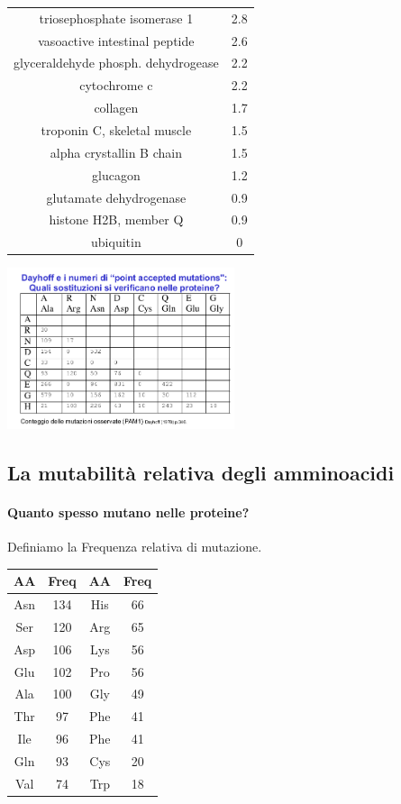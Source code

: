 \documentclass{article}
\begin{document}
\begin{center}
\begin{tabular}{c|c}
        triosephosphate isomerase 1 & 2.8 \\
        vasoactive intestinal peptide & 2.6 \\
        glyceraldehyde phosph. dehydrogease & 2.2 \\
        cytochrome c & 2.2 \\
        collagen & 1.7 \\
        troponin C, skeletal muscle & 1.5 \\
        alpha crystallin B chain & 1.5 \\
        glucagon & 1.2 \\
        glutamate dehydrogenase & 0.9 \\
        histone H2B, member Q & 0.9 \\
        ubiquitin & 0
    \end{tabular}
\end{center}
\begin{center}
    \includegraphics[width=0.5\textwidth]{figures/dayhoff2.png}\\
\end{center}
\subsection{La mutabilità relativa degli amminoacidi}
\paragraph{Quanto spesso mutano nelle proteine?}
Definiamo la Frequenza relativa di mutazione.
\begin{center}
    \begin{tabular}{c | c !{\vline width 2pt} c | c }
        \toprule
        \textbf{AA} & \textbf{Freq} & \textbf{AA} & \textbf{Freq}\\
        \midrule
        Asn & 134 & His & 66 \\
        Ser & 120 & Arg & 65 \\
        Asp & 106 & Lys & 56 \\
        Glu & 102 & Pro & 56 \\
        Ala & 100 & Gly & 49 \\
        Thr & 97 & Phe & 41 \\
        Ile & 96 & Phe & 41 \\
        Gln & 93 & Cys & 20 \\
        Val & 74 & Trp & 18 
    \end{tabular}
\end{center}
\end{document}
